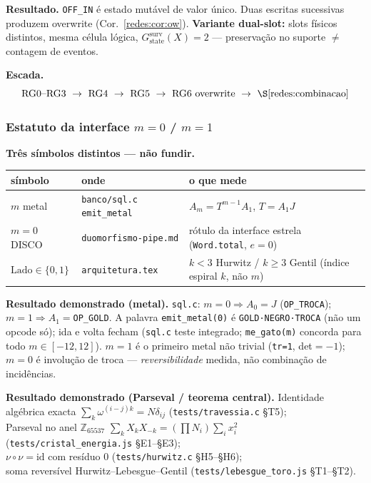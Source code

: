 \documentclass[11pt,a4paper]{article}
\newcommand{\code}[1]{\texttt{\small #1}}
\begin{document}
\medskip\noindent\textbf{Resultado.} \code{OFF\_IN} é estado mutável de valor único.
Duas escritas sucessivas produzem overwrite (Cor.~\ref{redes:cor:ow}).
\textbf{Variante dual-slot:} slots físicos distintos, mesma célula lógica,
$G_{\mathrm{state}}^{\mathrm{surv}}(X)=2$ --- preservação no suporte $\neq$
contagem de eventos.

\medskip\noindent\textbf{Escada.}
{\small
\[
\text{RG0--RG3}\ \to\ \text{RG4}\ \to\ \text{RG5}\ \to\ \text{RG6 overwrite}
\ \to\ \text{\S\ref{redes:combinacao}}
\]}

\subsubsection{Estatuto da interface $m{=}0$ / $m{=}1$}\label{redes:estatuto-m01}

\medskip\noindent\textbf{Três símbolos distintos --- não fundir.}
\begin{center}\footnotesize
\begin{tabular}{@{}>{\raggedright\arraybackslash}p{}>{\raggedright\arraybackslash}p{}>{\raggedright\arraybackslash}p{}@{}}
\toprule
símbolo & onde & o que mede \\
\midrule
$m$ metal & \code{banco/sql.c} \code{emit\_metal} & $A_m=T^{m-1}A_1$, $T=A_1J$ \\
$m{=}0$ DISCO & \code{duomorfismo-pipe.md} & rótulo da interface estrela (\code{Word.total}, $e{=}0$) \\
$\text{Lado}\in\{0,1\}$ & \code{arquitetura.tex} & $k{<}3$ Hurwitz / $k{\ge}3$ Gentil (índice espiral $k$, não $m$) \\
\bottomrule
\end{tabular}
\end{center}

\medskip\noindent\textbf{Resultado demonstrado (metal).}
\code{sql.c}: $m{=}0\Rightarrow A_0{=}J$ (\code{OP\_TROCA}); $m{=}1\Rightarrow A_1{=}$\code{OP\_GOLD}.
A palavra \code{emit\_metal(0)} é \code{GOLD·NEGRO·TROCA} (não um opcode só); ida e volta fecham
(\code{sql.c} teste integrado; \code{me\_gato(m)} concorda para todo $m\in[-12,12]$).
$m{=}1$ é o primeiro metal não trivial (\code{tr=1}, det${=}-1$); $m{=}0$ é involução de troca
--- \emph{reversibilidade} medida, não combinação de incidências.

\medskip\noindent\textbf{Resultado demonstrado (Parseval / teorema central).}
Identidade algébrica exacta $\sum_k\omega^{(i-j)k}=N\delta_{ij}$
(\code{tests/travessia.c} §T5);\\
Parseval no anel $\mathbb{Z}_{65537}$
$\sum_k X_kX_{-k}=(\prod N_i)\sum_i x_i^2$
(\code{tests/cristal\_energia.js} §E1--§E3);\\
$\nu\circ\nu{=}\mathrm{id}$ com resíduo $0$
(\code{tests/hurwitz.c} §H5--§H6);\\
soma reversível Hurwitz--Lebesgue--Gentil
(\code{tests/lebesgue\_toro.js} §T1--§T2).
\end{document}

